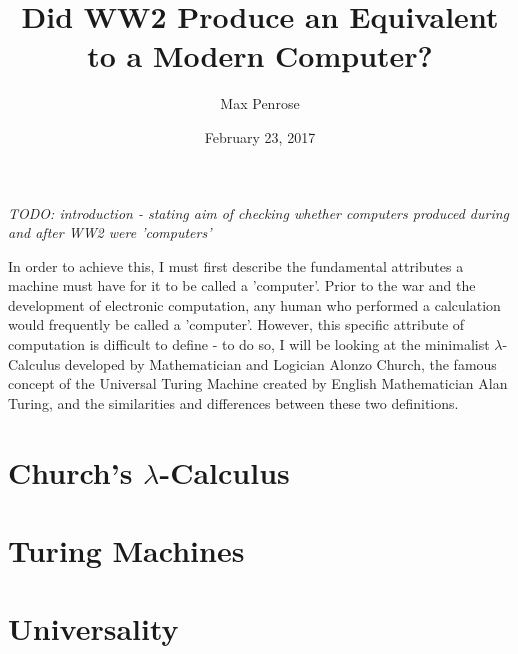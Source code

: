 \documentclass {article}
\title{Did WW2 Produce an Equivalent to a Modern Computer?}
\date{February 23, 2017}
\author{Max Penrose}
\begin{document}
\maketitle
\tableofcontents
\clearpage
\textit{TODO: introduction - stating aim of checking whether computers produced during and after WW2 were 'computers'}

In order to achieve this, I must first describe the fundamental attributes a machine must have for it to be called a 'computer'. Prior to the war and the development of electronic computation, any human who performed a calculation would  frequently be called a 'computer'. However, this specific attribute of computation is difficult to define - to do so, I will be looking at the minimalist  $\lambda$-Calculus developed by Mathematician and Logician Alonzo Church, the famous concept of the Universal Turing Machine created by English Mathematician Alan Turing, and the similarities and differences between these two definitions.

\section{Church's $\lambda$-Calculus}

%

\section{Turing Machines}

%

\section{Universality}

%
\printbibliography
\end{document}
